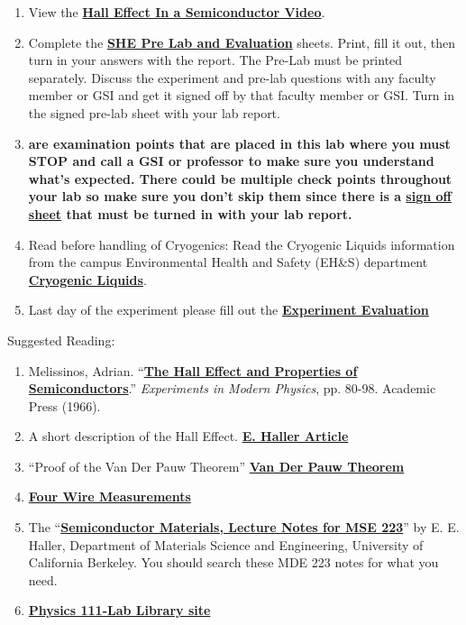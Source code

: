 \documentclass{../lab}
\newcommand{\VanDerPauwTheorem}{http://experimentationlab.berkeley.edu/node/105}
\newcommand{\SHEVideo}{http://youtu.be/7JYq1rRl6Xk}
\newcommand{\SHEPreLab}{http://experimentationlab.berkeley.edu/SHEPreLab}
\newcommand{\SignOffSheet}{http://experimentationlab.berkeley.edu/shecheckpoints}
\newcommand{\CryogenicLiquids}{http://experimentationlab.berkeley.edu/sites/default/files/images/77cryogenic.pdf}
\newcommand{\TheHallEffectandPropertiesofSemiconductors}{http://physics111.lib.berkeley.edu/Physics111/Reprints/SHE/SHE_Melissinos_properties_of_semiconductors_pg_80-98_1966.pdf}
\newcommand{\EHallerArticle}{http://physics111.lib.berkeley.edu/Physics111/Reprints/SHE/24-Haller.pdf}
\newcommand{\FourWireMeasurements}{http://physics111.lib.berkeley.edu/Physics111/Reprints/SHE/19-Four_Wire_Measurement.pdf}
\newcommand{\SemiconductorMaterialsLectureNotes}{http://physics111.lib.berkeley.edu/Physics111/Reprints/SHE/Semiconductor\%20Materials\%20Notes\%20MSE\%20223\%20Haller.pdf}
\begin{document}
\begin{enumerate}
    \item View the \href{\SHEVideo}{\textbf{Hall Effect In a Semiconductor Video}}.

    \item Complete the \href{\SHEPreLab}{\textbf{SHE Pre Lab and Evaluation}} sheets. Print, fill it out, then turn in your answers with the report. The Pre-Lab must be printed separately. Discuss the experiment and pre-lab questions with any faculty member or GSI and get it signed off by that faculty member or GSI. Turn in the signed pre-lab sheet with your lab report.

    \item \textbf{\underline{} are examination points that are placed in this lab where you must STOP and call a GSI or professor to make sure you understand what's expected. There could  be multiple check points throughout your lab so make sure you don't skip them since there is a \href{\SignOffSheet}{sign off sheet} that must be turned in with your lab report.}

    \item Read before handling of Cryogenics: Read the Cryogenic Liquids information from the campus Environmental Health and Safety (EH\&S) department \href{\CryogenicLiquids}{\textbf{Cryogenic Liquids}}.

    \item Last day of the experiment please fill out the \href{\ExperimentEvaluation}{\textbf{Experiment Evaluation}}
\end{enumerate}

\noindent Suggested Reading:

\begin{enumerate}
    \item Melissinos, Adrian. ``\href{\TheHallEffectandPropertiesofSemiconductors}{\textbf{The Hall Effect and Properties of Semiconductors}}.'' \emph{Experiments in Modern Physics}, pp. 80-98. Academic Press (1966).

    \item A short description of the Hall Effect. \href{\EHallerArticle}{\textbf{E. Haller Article}}

    \item ``Proof of the Van Der Pauw Theorem'' \href{\VanDerPauwTheorem}{\textbf{Van Der Pauw Theorem}}

    \item \href{\FourWireMeasurements}{\textbf{Four Wire Measurements}}

    \item The ``\href{\SemiconductorMaterialsLectureNotes}{\textbf{Semiconductor Materials, Lecture Notes for MSE 223}}'' by E. E. Haller, Department of Materials Science and Engineering, University of California Berkeley. You should search these MDE 223 notes for what you need.

    \item \href{\LabReprints}{\textbf{Physics 111-Lab Library site}}
\end{enumerate}
\end{document}
